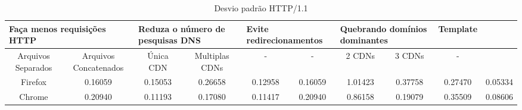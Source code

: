 \begin{table}[h]
	\centering
	\caption{Desvio padrão HTTP/1.1}
	\label{desviopadraohttp11}
	\begin{tabular}{cccccccccc}
		\hline
        \multicolumn{2}{l}{\textbf{Faça menos requisições HTTP}} & \multicolumn{2}{l}{\textbf{Reduza o número de pesquisas DNS}} & \multicolumn{2}{l}{\textbf{Evite redirecionamentos}} & \multicolumn{2}{l}{\textbf{Quebrando domínios dominantes}} & \textbf{Template} \\
		\hline
        Arquivos Separados & Arquivos Concatenados & Única CDN & Multiplas CDNs & - & - & 2 CDNs & 3 CDNs & - \\
		Firefox & 0.16059 & 0.15053 & 0.26658 & 0.12958 & 0.16059 & 1.01423 & 0.37758 & 0.27470 & 0.05334  \\
		Chrome & 0.20940 & 0.11193 & 0.17080 & 0.11417 & 0.20940 & 0.86158 & 0.19079 & 0.35509 & 0.08606  \\
		\hline
	\end{tabular}
\end{table}
